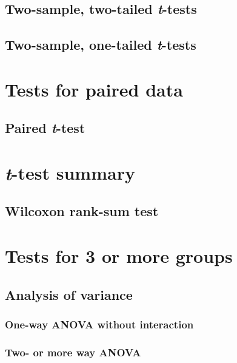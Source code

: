 \documentclass[
  13,
  letterpaper,
]{report}
\begin{document}
\subsection{\texorpdfstring{Two-sample, two-tailed
\emph{t}-tests}{Two-sample, two-tailed t-tests}}\label{sec-groups-2samp-2t}

\subsection{\texorpdfstring{Two-sample, one-tailed
\emph{t}-tests}{Two-sample, one-tailed t-tests}}\label{sec-groups-2samp-1t}

\section{Tests for paired data}\label{sec-groups-paired}

\subsection{\texorpdfstring{Paired
\emph{t}-test}{Paired t-test}}\label{sec-groups-paired-pt}

\section{\texorpdfstring{\emph{t}-test
summary}{t-test summary}}\label{sec-groups-ttests}

\subsection{Wilcoxon rank-sum test}\label{sec-groups-2samp-wilcoxon}

\section{Tests for 3 or more groups}\label{sec-groups-more}

\subsection{Analysis of variance}\label{sec-groups-more-anova}

\subsubsection{One-way ANOVA without
interaction}\label{sec-groups-more-anova-1way}

\subsubsection{Two- or more way ANOVA}\label{sec-groups-more-anova-ways}
\end{document}
